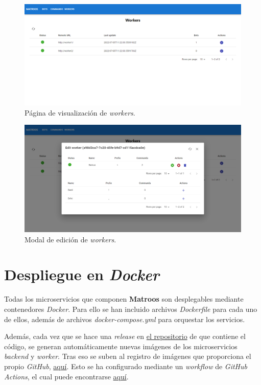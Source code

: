 \begin{figure}[H]
	\centering
	\includegraphics[width=1\textwidth]{img/front/page-workers.png}
	\caption{Página de visualización de \textit{workers}.}
\end{figure}

\begin{figure}[H]
	\centering
	\includegraphics[width=1\textwidth]{img/front/page-workers-edit.png}
	\caption{Modal de edición de \textit{workers}.}
\end{figure}

\section{Despliegue en \textit{Docker}}

Todas los microservicios que componen \textbf{Matroos} son desplegables mediante contenedores \textit{Docker}. Para ello se han incluido archivos \textit{Dockerfile} para cada uno de ellos, además de archivos \textit{docker-compose.yml} para orquestar los servicios.

Además, cada vez que se hace una \textit{release} en \href{https://github.com/harvestcore/matroos}{el repositorio} de que contiene el código, se generan automáticamente nuevas imágenes de los microservicios \textit{backend} y \textit{worker}. Tras eso se suben al registro de imágenes que proporciona el propio \textit{GitHub}, \href{https://github.com/harvestcore?tab=packages&repo_name=matroos}{aquí}. Esto se ha configurado mediante un \textit{workflow} de \textit{GitHub Actions}, el cual puede encontrarse \href{https://github.com/harvestcore/matroos/blob/develop/.github/workflows/build-docker-images.yml}{aquí}.

